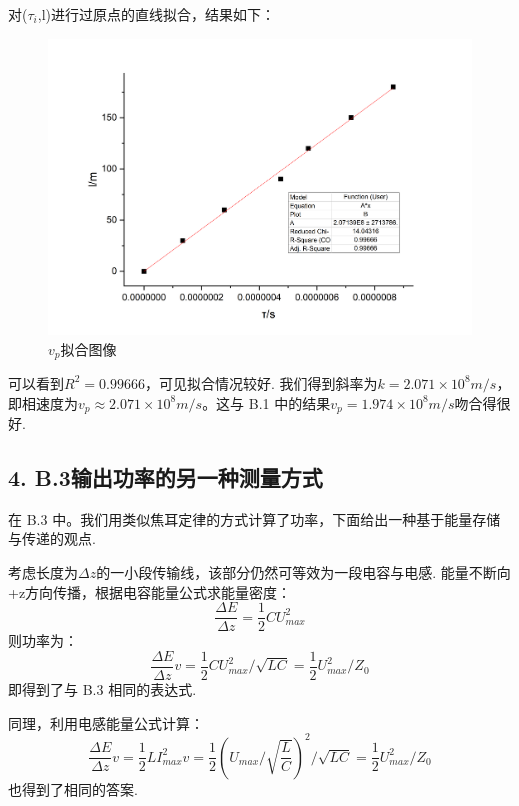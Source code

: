 \documentclass[UTF8]{ctexart}
\begin{document}
对($\tau_i$,l)进行过原点的直线拟合，结果如下：

\begin{figure}[H]
    \centering
    \includegraphics[scale=0.5]{linear2.png}
    \caption*{$v_p$拟合图像}     
\end{figure}
可以看到$R^2=0.99666$，可见拟合情况较好. 我们得到斜率为$k=2.071\times 10^8m/s$，即相速度为$v_p\approx2.071\times 10^8m/s$。这与 B.1 中的结果$v_p=1.974\times 10^8m/s$吻合得很好.

\subsection*{4. B.3输出功率的另一种测量方式}
在 B.3 中。我们用类似焦耳定律的方式计算了功率，下面给出一种基于能量存储与传递的观点. 

考虑长度为$\Delta z$的一小段传输线，该部分仍然可等效为一段电容与电感. 能量不断向+z方向传播，根据电容能量公式求能量密度：
\begin{equation}
    \frac{\Delta E}{\Delta z}=\frac{1}{2}CU_{max}^2
\end{equation}
则功率为：
\begin{equation}
    \frac{\Delta E}{\Delta z}v=\frac{1}{2}CU_{max}^2/\sqrt{LC}=\frac{1}{2}U_{max}^2/Z_0
\end{equation}
即得到了与 B.3 相同的表达式.

同理，利用电感能量公式计算：
\begin{equation}
    \frac{\Delta E}{\Delta z}v=\frac{1}{2}LI_{max}^2v=\frac{1}{2}(U_{max}/\sqrt{\frac{L}{C}})^2/\sqrt{LC}=\frac{1}{2}U_{max}^2/Z_0
\end{equation}
也得到了相同的答案.
\end{document}
